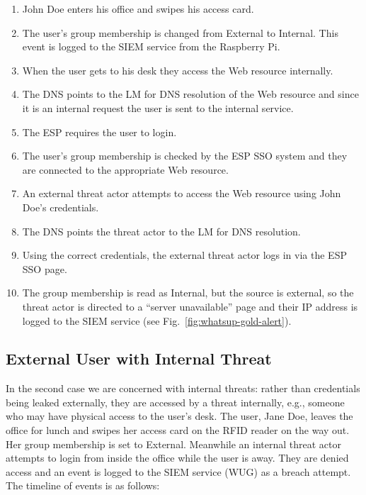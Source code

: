 \begin{enumerate}
\item John Doe enters his office and swipes his access card.
\item The user's group membership is changed from External to
  Internal.  This event is logged to the SIEM service from the
  Raspberry Pi.
\item When the user gets to his desk they access the Web resource
  internally.
\item The DNS points to the LM for DNS resolution of the Web resource
  and since it is an internal request the user is sent to the internal
  service.
\item The ESP requires the user to login.
\item The user's group membership is checked by the ESP SSO system and
  they are connected to the appropriate Web resource.
\item An external threat actor attempts to access the Web resource
  using John Doe's credentials.
\item The DNS points the threat actor to the LM for DNS resolution.
\item Using the correct credentials, the external threat actor logs in
  via the ESP SSO page.
\item The group membership is read as Internal, but the source is
  external, so the threat actor is directed to a ``server
  unavailable'' page and their IP address is logged to the SIEM
  service (see Fig.~\ref{fig:whatsup-gold-alert}).
\end{enumerate}

\subsection{External User with Internal Threat}\label{sec:case-two}

In the second case we are concerned with internal threats: rather than
credentials being leaked externally, they are accessed by a threat
internally, e.g., someone who may have physical access to the user's
desk.  The user, Jane Doe, leaves the office for lunch and swipes her
access card on the RFID reader on the way out.  Her group membership
is set to External.  Meanwhile an internal threat actor attempts to
login from inside the office while the user is away.  They are denied
access and an event is logged to the SIEM service (WUG) as a breach
attempt.  The timeline of events is as follows:

